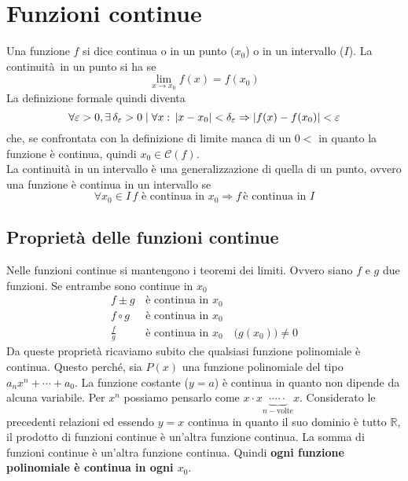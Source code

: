 
\section{Funzioni continue}\label{sec:funzCont}

Una funzione $f$ si dice continua o in un punto ($x_0$) o in un intervallo ($I$). La continuità in
un punto si ha se
\begin{equation*}
  \lim\limits_{x\to x_0}f(x) = f(x_0) 
\end{equation*}
La definizione formale quindi diventa
\begin{equation*}
  \forall\varepsilon>0,\exists\,\delta_\varepsilon>0\mid\forall x:\,\lvert x-x_0\rvert<\delta_\varepsilon
  \Rightarrow \lvert f(x)-f(x_0)\rvert<\varepsilon
\end{equation*}
che, se confrontata con la definizione di limite manca di un $0<$ in quanto la funzione è continua,
quindi $x_0\in\mathscr{C}(f)$.\\
La continuità in un intervallo è una generalizzazione di quella di un punto, ovvero una funzione
è continua in un intervallo se
\begin{equation*}
  \forall x_0\in I\,f\text{ è continua in }x_0\Rightarrow f\,\text{è continua in } I
\end{equation*}

\subsection{Proprietà delle funzioni continue}
Nelle funzioni continue si mantengono i teoremi dei limiti. Ovvero siano $f$ e $g$ due funzioni.
Se entrambe sono continue in $x_0$
\begin{align*}
  f\pm g\,&\text{è continua in }x_0\\
  f\circ g\,&\text{è continua in }x_0\\
  \frac{f}{g}\,&\text{è continua in }x_0\quad \big(g(x_0)\big)\neq0
\end{align*}
Da queste proprietà ricaviamo subito che qualsiasi funzione polinomiale è continua. Questo perché,
sia $P(x)$ una funzione polinomiale del tipo $a_nx^n+\dotsb+a_0$. La funzione costante ($y=a$) è
continua in quanto non dipende da alcuna variabile. Per $x^n$ possiamo pensarlo come $x\cdot
x\underbrace{\cdot\dotsb\cdot}_{n-\text{volte}}x$. Considerato le precedenti relazioni ed essendo
$y=x$ continua in quanto il suo dominio è tutto $\mathbb{R}$, il prodotto di funzioni
continue è un'altra funzione continua. La somma di funzioni continue è un'altra funzione continua.
Quindi \textbf{ogni funzione polinomiale è continua in ogni $x_0$}.

